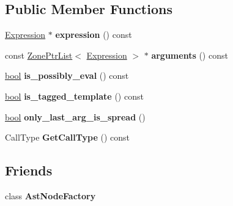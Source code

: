 \subsection*{Public Member Functions}
\begin{DoxyCompactItemize}
\item 
\mbox{\label{classv8_1_1internal_1_1Call_a7807fdf1f502d7654683abacf5bc5731}} 
\mbox{\hyperlink{classv8_1_1internal_1_1Expression}{Expression}} $\ast$ {\bfseries expression} () const
\item 
\mbox{\label{classv8_1_1internal_1_1Call_a0a67e6b91d18ef44808ef99efa9db709}} 
const \mbox{\hyperlink{classv8_1_1internal_1_1ZoneList}{Zone\+Ptr\+List}}$<$ \mbox{\hyperlink{classv8_1_1internal_1_1Expression}{Expression}} $>$ $\ast$ {\bfseries arguments} () const
\item 
\mbox{\label{classv8_1_1internal_1_1Call_a7cc8f98923e98908e18b0364db576a47}} 
\mbox{\hyperlink{classbool}{bool}} {\bfseries is\+\_\+possibly\+\_\+eval} () const
\item 
\mbox{\label{classv8_1_1internal_1_1Call_a39fc7130ba9bba511aef802cfb7d62c6}} 
\mbox{\hyperlink{classbool}{bool}} {\bfseries is\+\_\+tagged\+\_\+template} () const
\item 
\mbox{\label{classv8_1_1internal_1_1Call_a7fcf79cfeb4ccc37661e1e25905d64f8}} 
\mbox{\hyperlink{classbool}{bool}} {\bfseries only\+\_\+last\+\_\+arg\+\_\+is\+\_\+spread} ()
\item 
\mbox{\label{classv8_1_1internal_1_1Call_a8bdcb354f3a82d0476ff2d314ecd7f33}} 
Call\+Type {\bfseries Get\+Call\+Type} () const
\end{DoxyCompactItemize}
\subsection*{Friends}
\begin{DoxyCompactItemize}
\item 
\mbox{\label{classv8_1_1internal_1_1Call_a8d587c8ad3515ff6433eb83c578e795f}} 
class {\bfseries Ast\+Node\+Factory}
\end{DoxyCompactItemize}
